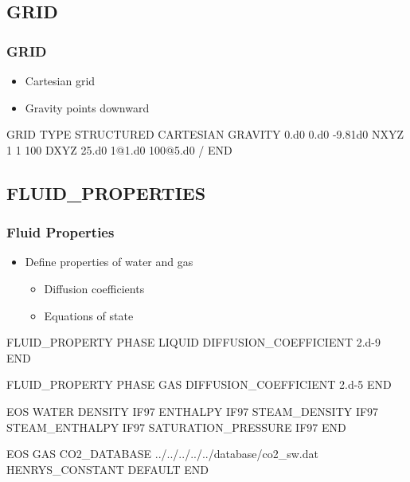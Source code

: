 \documentclass{beamer}
\begin{document}
\subsection{GRID}
\begin{frame}\frametitle{GRID}

\begin{itemize}
  \item Cartesian grid
  \item Gravity points downward
\end{itemize}

\begin{semiverbatim}
GRID
  TYPE STRUCTURED CARTESIAN
  GRAVITY 0.d0 0.d0 -9.81d0
  NXYZ 1 1 100
  DXYZ
    25.d0
    1@1.d0
    100@5.d0
  /
END
\end{semiverbatim}

\end{frame}
\subsection{FLUID\_PROPERTIES}
\begin{frame}\frametitle{Fluid Properties}

\begin{itemize}
  \item Define properties of water and gas
  \begin{itemize}
    \item Diffusion coefficients
    \item Equations of state
  \end{itemize}
\end{itemize}

\begin{semiverbatim}
FLUID_PROPERTY
  PHASE LIQUID
  DIFFUSION_COEFFICIENT 2.d-9
END

FLUID_PROPERTY
  PHASE GAS
  DIFFUSION_COEFFICIENT 2.d-5
END

\newpage

EOS WATER
  DENSITY IF97
  ENTHALPY IF97
  STEAM_DENSITY IF97
  STEAM_ENTHALPY IF97
  SATURATION_PRESSURE IF97
END

EOS GAS
  CO2_DATABASE ../../../../../database/co2_sw.dat
  HENRYS_CONSTANT DEFAULT
END

\end{semiverbatim}

\end{frame}
\end{document}
